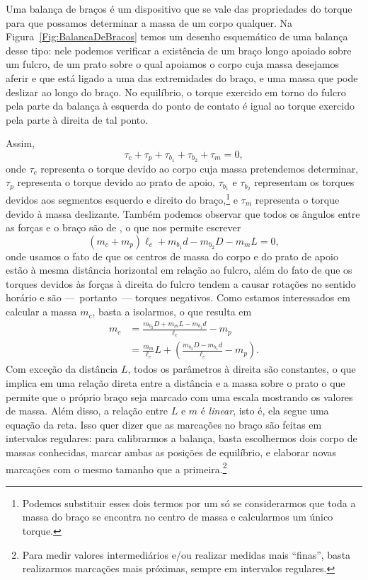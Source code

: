 Uma balança de braços é um dispositivo que se vale das propriedades do torque para que possamos determinar a massa de um corpo qualquer. Na Figura~\ref{Fig:BalancaDeBracos} temos um desenho esquemático de uma balança desse tipo: nele podemos verificar a existência de um braço longo apoiado sobre um fulcro, de um prato sobre o qual apoiamos o corpo cuja massa desejamos aferir e que está ligado a uma das extremidades do braço, e uma massa que pode deslizar ao longo do braço. No equilíbrio, o torque exercido em torno do fulcro pela parte da balança à esquerda do ponto de contato é igual ao torque exercido pela parte à direita de tal ponto.

Assim,
\begin{equation}
    \tau_c + \tau_p + \tau_{b_1} + \tau_{b_2} + \tau_m = 0,
\end{equation}
%
onde $\tau_c$ representa o torque devido ao corpo cuja massa pretendemos determinar, $\tau_p$ representa o torque devido ao prato de apoio, $\tau_{b_1}$ e $\tau_{b_2}$ representam os torques devidos aos segmentos esquerdo e direito do braço,\footnote{Podemos substituir esses dois termos por um só se considerarmos que toda a massa do braço se encontra no centro de massa e calcularmos um único torque.} e $\tau_m$ representa o torque devido à massa deslizante. Também podemos observar que todos os ângulos entre as forças e o braço são de , o que nos permite escrever
\begin{equation}
    (m_c + m_p) \ell_c + m_{b_1} d - m_{b_2} D - m_m L = 0,
\end{equation}
%
onde usamos o fato de que os centros de massa do corpo e do prato de apoio estão à mesma distância horizontal em relação ao fulcro, além do fato de que os torques devidos às forças à direita do fulcro tendem a causar rotações no sentido horário e são ---~portanto~--- torques negativos. Como estamos interessados em calcular a massa $m_c$, basta a isolarmos, o que resulta em
\begin{align}
    m_c &= \frac{m_{b_2} D + m_m L - m_{b_1}d}{\ell_c} - m_p\\
    &= \frac{m_{m}}{\ell_c} L + \left(\frac{m_{b_2} D - m_{b_1}d}{\ell_c} - m_p\right).
\end{align}
%
Com exceção da distância $L$, todos os parâmetros à direita são constantes, o que implica em uma relação direta entre a distância e a massa sobre o prato o que permite que o próprio braço seja marcado com uma escala mostrando os valores de massa. Além disso, a relação entre $L$ e $m$ é \emph{linear}, isto é, ela segue uma equação da reta. Isso quer dizer que as marcações no braço são feitas em intervalos regulares: para calibrarmos a balança, basta escolhermos dois corpo de massas conhecidas, marcar ambas as posições de equilíbrio, e elaborar novas marcações com o mesmo tamanho que a primeira.\footnote[][-2cm]{Para medir valores intermediários e/ou realizar medidas mais ``finas'', basta realizarmos marcações mais próximas, sempre em intervalos regulares.}

